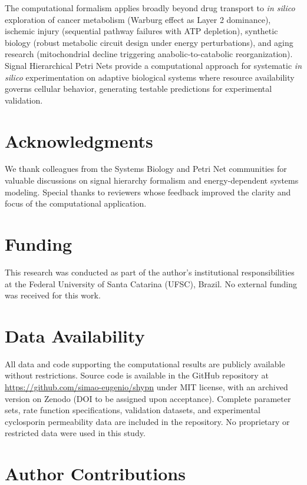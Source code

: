 \documentclass[10pt,letterpaper]{article}
\begin{document}
The computational formalism applies broadly beyond drug transport to \textit{in silico} exploration of cancer metabolism (Warburg effect as Layer 2 dominance), ischemic injury (sequential pathway failures with ATP depletion), synthetic biology (robust metabolic circuit design under energy perturbations), and aging research (mitochondrial decline triggering anabolic-to-catabolic reorganization). Signal Hierarchical Petri Nets provide a computational approach for systematic \textit{in silico} experimentation on adaptive biological systems where resource availability governs cellular behavior, generating testable predictions for experimental validation.

\section*{Acknowledgments}

We thank colleagues from the Systems Biology and Petri Net communities for valuable discussions on signal hierarchy formalism and energy-dependent systems modeling. Special thanks to reviewers whose feedback improved the clarity and focus of the computational application.

\section*{Funding}

This research was conducted as part of the author's institutional responsibilities at the Federal University of Santa Catarina (UFSC), Brazil. No external funding was received for this work.

\section*{Data Availability}

All data and code supporting the computational results are publicly available without restrictions. Source code is available in the GitHub repository at \url{https://github.com/simao-eugenio/shypn} under MIT license, with an archived version on Zenodo (DOI to be assigned upon acceptance). Complete parameter sets, rate function specifications, validation datasets, and experimental cyclosporin permeability data are included in the repository. No proprietary or restricted data were used in this study.

\section*{Author Contributions}
\end{document}
